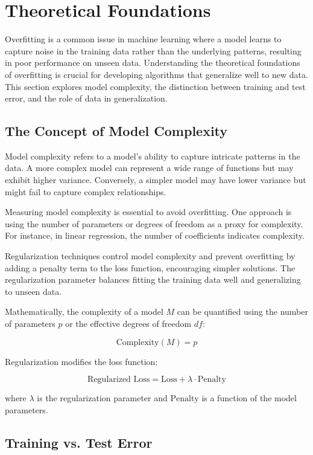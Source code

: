 \documentclass[12pt]{book} %
\begin{document}
\section{Theoretical Foundations}

Overfitting is a common issue in machine learning where a model learns to capture noise in the training data rather than the underlying patterns, resulting in poor performance on unseen data. Understanding the theoretical foundations of overfitting is crucial for developing algorithms that generalize well to new data. This section explores model complexity, the distinction between training and test error, and the role of data in generalization.

\subsection{The Concept of Model Complexity}

Model complexity refers to a model's ability to capture intricate patterns in the data. A more complex model can represent a wide range of functions but may exhibit higher variance. Conversely, a simpler model may have lower variance but might fail to capture complex relationships.

Measuring model complexity is essential to avoid overfitting. One approach is using the number of parameters or degrees of freedom as a proxy for complexity. For instance, in linear regression, the number of coefficients indicates complexity.

Regularization techniques control model complexity and prevent overfitting by adding a penalty term to the loss function, encouraging simpler solutions. The regularization parameter balances fitting the training data well and generalizing to unseen data.

Mathematically, the complexity of a model \(M\) can be quantified using the number of parameters \(p\) or the effective degrees of freedom \(df\):

\[ \text{Complexity}(M) = p \]

Regularization modifies the loss function:

\[ \text{Regularized Loss} = \text{Loss} + \lambda \cdot \text{Penalty} \]

where \(\lambda\) is the regularization parameter and \(\text{Penalty}\) is a function of the model parameters.

\subsection{Training vs. Test Error}
\end{document}
